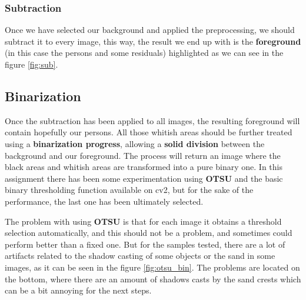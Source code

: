 \documentclass[10pt]{article}
\begin{document}





\subsubsection*{Subtraction}

Once we have selected our background and applied the preprocessing, we should subtract it to every image, this way, the result we end up with is the \textbf{foreground} (in this case the persons and some residuals) highlighted as we can see in the figure \ref{fig:sub}.



\subsection{Binarization}

Once the subtraction has been applied to all images, the resulting foreground will contain hopefully our persons. All those whitish areas should be further treated using a \textbf{binarization progress}, allowing a \textbf{solid division} between  the background and our foreground. The process will return an image where the black areas and whitish areas are transformed into a pure binary one. In this assignment there has been some experimentation using \textbf{OTSU} and the basic binary thresholding function available on cv2, but for the sake of the performance, the last one has been ultimately selected.\medskip

The problem with using \textbf{OTSU} is that for each image it obtains a threshold selection automatically, and this should not be a problem, and sometimes could perform better than a fixed one. But for the samples tested, there are a lot of artifacts related to the shadow casting of some objects or the sand in some images, as it can be seen in the figure \ref{fig:otsu_bin}. The problems are located on the bottom, where there are an amount of shadows casts by the sand crests which can be a bit annoying for the next steps.\medskip
\end{document}
